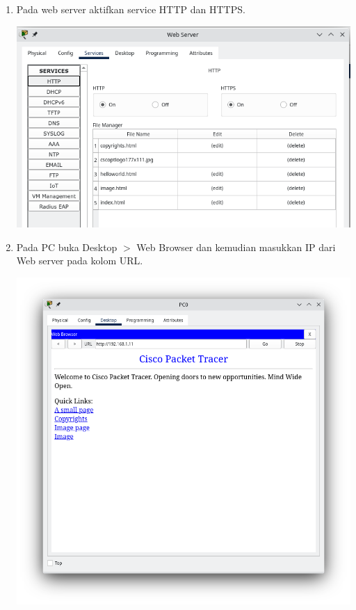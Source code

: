 \documentclass{article}
\begin{document}
\begin{flushleft}
\begin{enumerate}
            \item Pada web server aktifkan service HTTP dan HTTPS.
            
            \begin{center}
                \includegraphics[scale=0.5]{3-6.png}
            \end{center}

            \item Pada PC buka Desktop $>$ Web Browser dan kemudian masukkan IP dari Web server pada kolom URL.
            
            \begin{center}
                \includegraphics[scale=0.5]{3-7.png}
            \end{center}


\end{enumerate}
\end{flushleft}
\end{document}
